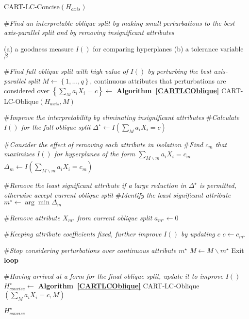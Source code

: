 \begin{algorithm}
\caption{CART-LC-Concise$(H_{axis})$}
\begin{algorithmic}
\STATE \#\emph{Find an interpretable oblique split by making small perturbations to the best axis-parallel split and by removing insignificant attributes}

\medskip
\REQUIRE (a) a goodness measure $I()$ for comparing hyperplanes (b) a tolerance variable $\beta$

\medskip
\STATE \#\emph{Find full oblique split with high value of $I()$ by perturbing the best axis-parallel split}
\STATE $M\leftarrow\left\{1,\ldots,q\right\}$, continuous attributes that perturbations are considered over
\STATE $\left\{\sum_M a_i X_i=c\right\}\leftarrow$ \textbf{Algorithm~\ref{CARTLCOblique}} CART-LC-Oblique$(H_{axis},M)$

\medskip
\STATE \#\emph{Improve the interpretability by eliminating insignificant attributes}
\LOOP
	\STATE \#\emph{Calculate $I()$ for the full oblique split}
	\STATE $\Delta^\star\leftarrow I(\sum_M a_i X_i=c)$

	\medskip
	\STATE \#\emph{Consider the effect of removing each attribute in isolation}
	\STATE \#\emph{Find $c_m$ that maximizes $I()$ for hyperplanes of the form $\sum_{M\backslash m} a_i X_i=c_m$}
	\STATE $\Delta_m\leftarrow I(\sum_{M\backslash m} a_i X_i=c_m)$
	\ENDFOR

	\medskip
	\STATE \#\emph{Remove the least significant attribute if a large reduction in $\Delta^\star$ is permitted, otherwise accept current oblique split}
		\STATE \#\emph{Identify the least significant attribute}
		\STATE $m^\star\leftarrow \arg\min \Delta_m$

		\medskip
		\STATE \#\emph{Remove attribute $X_{m^\star}$ from current oblique split}
		\STATE $a_{m^\star}\leftarrow 0$ 

		\medskip
		\STATE \#\emph{Keeping attribute coefficients fixed, further improve $I()$ by updating $c$}
		\STATE $c\leftarrow c_{m^\star}$

		\medskip
		\STATE \#\emph{Stop considering perturbations over continuous attribute $m^\star$}
		\STATE $M\leftarrow M\backslash m^\star$
	\ELSE
		\STATE Exit \textbf{loop}
	\ENDIF

	\medskip
\ENDLOOP

\medskip
\STATE \#\emph{Having arrived at a form for the final oblique split, update it to improve $I()$}
\STATE $H_{concise}^\star\leftarrow$ 
\textbf{Algorithm~\ref{CARTLCOblique}} CART-LC-Oblique$(\sum_M a_i X_i=c,M)$

\medskip
\RETURN $H_{concise}^\star$
\end{algorithmic}
\label{CARTLCConcise}
\end{algorithm}

